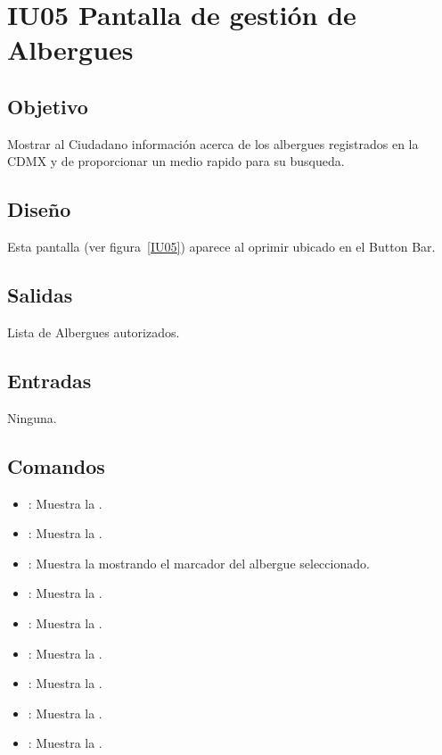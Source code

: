\section{IU05 Pantalla de gestión de Albergues}

\subsection{Objetivo}
	Mostrar al Ciudadano información acerca de los albergues registrados en la CDMX y de proporcionar un medio rapido para su busqueda.

\subsection{Diseño}
	Esta pantalla  (ver figura~\ref{IU05}) aparece al oprimir  ubicado en el Button Bar.


\subsection{Salidas}

	Lista de Albergues autorizados.

\subsection{Entradas}
	Ninguna.

\subsection{Comandos}
\begin{itemize}
	\item {}: Muestra la .
	\item {}: Muestra la .
	\item {}: Muestra la  mostrando el marcador del albergue seleccionado.
	\item {}: Muestra la .
	\item {}: Muestra la .
	\item {}: Muestra la .
	\item {}: Muestra la .
	\item {}: Muestra la .
	\item {}: Muestra la .
\end{itemize}

